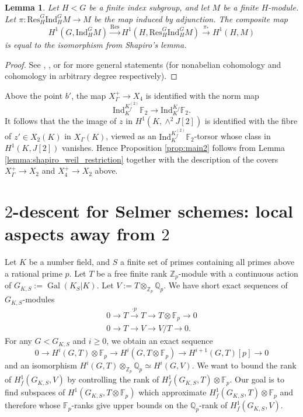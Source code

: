 \documentclass[11pt]{amsart}
\def\Z{\mathbb Z}
\def\Q{\mathbb Q}
\def\F{\mathbb F}
\theoremstyle{plain}
\newtheorem{lemma}{Lemma}
\theoremstyle{definition}
\DeclareMathOperator{\Gal}{Gal}
\newcommand{\Ind}{\mathrm{Ind}}
\newcommand{\Res}{\mathrm{Res}}
\begin{document}
\begin{lemma}\label{lemma:concrete_shapiro}
Let $H<G$ be a finite index subgroup, and let $M$ be a finite $H$-module. Let $\pi :\Res ^G _H \Ind ^G _H M\to M$ be the map induced by adjunction.
The composite map
\[
H^1 (G,\Ind ^G _H M) \stackrel{\Res }{\longrightarrow }H^1 (H,\Res ^G _H \Ind ^G _H M) \stackrel{\pi _* }{\longrightarrow }H^1 (H,M) 
\]
is equal to the isomorphism from Shapiro's lemma.
\end{lemma}
\begin{proof}
See \cite{stix2010trading}, \cite{stix2013correction}, or \cite{NSW} for more general statements (for nonabelian cohomology and cohomology in arbitrary degree respectively).
\end{proof}


Above the point $b'$, the map $X_{\Gamma }^+ \to X_4$ is identified with the norm map
\[
\Ind ^{K_{f}^{(2)}}_{K }\F _2 \to \Ind ^{K_f }_K \F _2 .
\]
It follows that the the image of $z$ in $H^1 (K,\wedge ^2 J[2])$ is identified with the fibre of $z'\in X_2 (K)$ in $X_{\Gamma }(K)$, viewed as an $\Ind ^{K_f ^{(2)}}_K \F_2$-torsor whose class in $H^1 (K,J[2])$ vanishes. Hence Proposition \ref{prop:main2}
 follows from Lemma \ref{lemma:shapiro_weil_restriction} together with the description of the covers $X_{\Gamma }^+ \to X_2 $ and $X_4 ^+ \to X_2 $ above.

\section{$2$-descent for Selmer schemes: local aspects away from $2$}

Let $K$ be a number field, and $S$ a finite set of primes containing all primes above a rational prime $p$. Let $T$ be a free finite rank $\mathbb{Z}_p$-module with a continuous action of $G_{K,S}:=\Gal (K_S |K)$. Let $V:=T\otimes _{\Z _p }\Q _p $. We have short exact sequences of $G_{K ,S}$-modules
\begin{align}
0\to T\stackrel{\cdot p}{\longrightarrow }T\to T\otimes \F _p \to 0 \\
0\to T\to V\to V/T \to 0.
\end{align}
For any $G<G_{K ,S}$ and $i\geq 0$, we obtain an exact sequence
\begin{equation}\label{eqn:Hi}
0\to H^i (G,T)\otimes \F _p \to H^i (G,T\otimes \F _p )\to H^{i+1} (G,T)[p]\to 0
\end{equation}
and an isomorphism $H^i (G,T)\otimes _{\Z _p }\Q _p \simeq H^i (G,V)$. We want to bound the rank of $H^1 _f (G_{K ,S},V)$ by controlling the rank of $H^1 _f (G_{K ,S},T)\otimes \F _p $. Our goal is to find subspaces of $H^1 (G_{K ,S},T\otimes \F _p )$ which approximate $H^1 _f (G_{K ,S},T)\otimes \F _p $ and therefore whose $\F _p$-ranks give upper bounds on the $\Q _p $-rank of $H^1 _f (G_{K ,S},V)$. 
\end{document}
